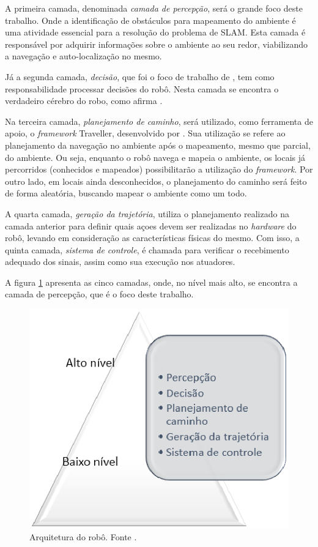 		A primeira camada, denominada \textit{camada de percepção}, será o grande foco deste trabalho. Onde a identificação de obstáculos para mapeamento do ambiente é uma atividade essencial para a resolução do problema de SLAM. Esta camada é responsável por adquirir informações sobre o ambiente ao seu redor, viabilizando a navegação e auto-localização no mesmo.

		Já a segunda camada, \textit{decisão}, que foi o foco de trabalho de \cite{tccCarol}, tem como responsabilidade processar decisões do robô. Nesta camada se encontra o verdadeiro cérebro do robo, como afirma \cite{vieira}.

		Na terceira camada, \textit{planejamento de caminho}, será utilizado, como ferramenta de apoio, o \textit{framework} Traveller, desenvolvido por \cite{tccRodrigo}. Sua utilização se refere ao planejamento da navegação no ambiente após o mapeamento, mesmo que parcial, do ambiente. Ou seja, enquanto o robô navega e mapeia o ambiente, os locais já percorridos (conhecidos e mapeados) possibilitarão a utilização do \textit{framework}. Por outro lado, em locais ainda desconhecidos, o planejamento do caminho será feito de forma aleatória, buscando mapear o ambiente como um todo.

		A quarta camada, \textit{geração da trajetória}, utiliza o planejamento realizado na camada anterior para definir quais açoes devem ser realizadas no \textit{hardware} do robô, levando em consideração as características físicas do mesmo. Com isso, a quinta camada, \textit{sistema de controle}, é chamada para verificar o recebimento adequado dos sinais, assim como sua execução nos atuadores. 

		A figura \ref{img:camadas} apresenta as cinco camadas, onde, no nível mais alto, se encontra a camada de percepção, que é o foco deste trabalho. 

		\begin{figure}[H]
			\centering
			\includegraphics[scale=0.5]{figuras/camadas.eps}
			\caption[Arquitetura do robô]{Arquitetura do robô. Fonte \cite{vieira}.}
			\label{img:camadas}
		\end{figure}

